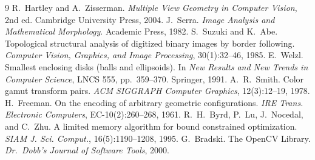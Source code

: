 \documentclass[11pt,a4paper]{article}
\theoremstyle{definition}
\theoremstyle{remark}
\begin{document}
\begin{thebibliography}{9}
 R.~Hartley and A.~Zisserman. \emph{Multiple View Geometry
in Computer Vision}, 2nd ed. Cambridge University Press, 2004.
 J.~Serra. \emph{Image Analysis and Mathematical Morphology}.
Academic Press, 1982.
 S.~Suzuki and K.~Abe. Topological structural analysis of
digitized binary images by border following. \emph{Computer Vision, Graphics,
and Image Processing}, 30(1):32--46, 1985.
 E.~Welzl. Smallest enclosing disks (balls and ellipsoids).
In \emph{New Results and New Trends in Computer Science}, LNCS 555, pp.~359--370.
Springer, 1991.
 A.~R.~Smith. Color gamut transform pairs. \emph{ACM SIGGRAPH
Computer Graphics}, 12(3):12--19, 1978.
 H.~Freeman. On the encoding of arbitrary geometric
configurations. \emph{IRE Trans. Electronic Computers}, EC-10(2):260--268, 1961.
 R.~H.~Byrd, P.~Lu, J.~Nocedal, and C.~Zhu. A limited memory
algorithm for bound constrained optimization. \emph{SIAM J. Sci. Comput.},
16(5):1190--1208, 1995.
 G.~Bradski. The OpenCV Library. \emph{Dr.\ Dobb's Journal of
Software Tools}, 2000.
\end{thebibliography}
\end{document}
